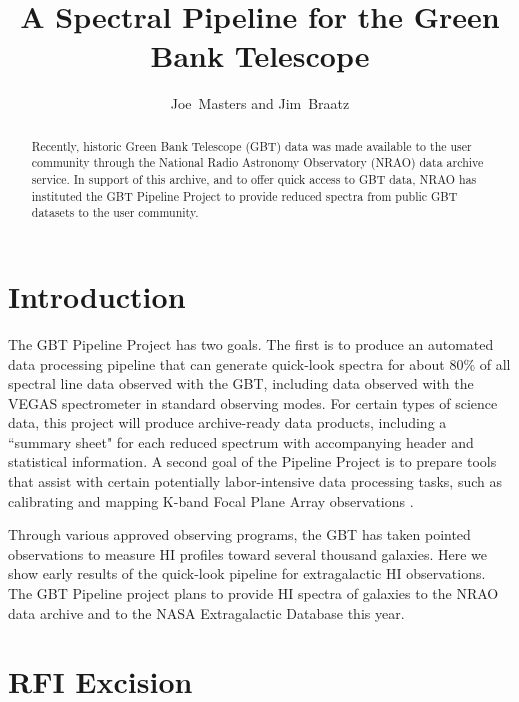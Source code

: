 
\resetcounters




\title{A Spectral Pipeline for the Green Bank Telescope}
\author{Joe~Masters and Jim~Braatz
}


\begin{abstract}
Recently, historic Green Bank Telescope (GBT) data was made available to the user community through the National Radio Astronomy Observatory (NRAO) data archive service.  In support of this archive, and to offer quick access to GBT data, NRAO has instituted the GBT Pipeline Project to provide reduced spectra from public GBT datasets to the user community.
\end{abstract}

\section{Introduction}

The GBT Pipeline Project has two goals. The first is to produce an automated data processing pipeline that can generate quick-look spectra for about 80\% of all spectral line data observed with the GBT, including data observed with the VEGAS spectrometer \citep{2012arXiv1202.0938A} in standard observing modes. For certain types of science data, this project will produce archive-ready data products, including a ``summary sheet" for each reduced spectrum with accompanying header and statistical information. A second goal of the Pipeline Project is to prepare tools that assist with certain potentially labor-intensive data processing tasks, such as calibrating and mapping K-band Focal Plane Array observations \citep[see][]{2011ASPC..442..127M}.

Through various approved observing programs, the GBT has taken pointed observations to measure HI profiles toward several thousand galaxies. Here we show early results of the quick-look pipeline for extragalactic HI observations. The GBT Pipeline project plans to provide HI spectra of galaxies to the NRAO data archive and to the NASA Extragalactic Database this year.

\section{RFI Excision}

